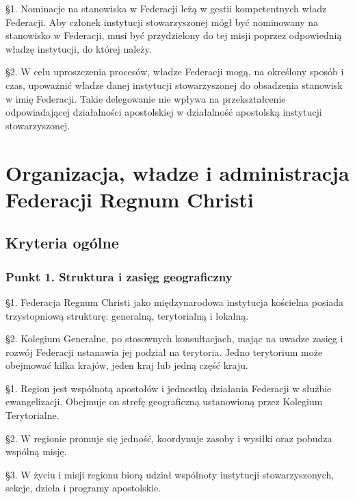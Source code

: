  
 \S{}1. Nominacje na stanowiska w Federacji leżą w gestii kompetentnych władz Federacji. Aby członek instytucji stowarzyszonej mógł być nominowany na stanowisko w Federacji, musi być przydzielony do tej misji poprzez odpowiednią władzę instytucji, do której należy.


\S{}2. W celu uproszczenia procesów, władze Federacji mogą, na określony sposób i czas, upoważnić władze danej instytucji stowarzyszonej do obsadzenia stanowisk w imię Federacji. Takie delegowanie nie wpływa na przekształcenie odpowiadającej działalności apostolskiej w działalność apostolską instytucji stowarzyszonej.
 


 \part{Organizacja, władze i administracja\\Federacji Regnum Christi}


 \chapter{Kryteria ogólne}


\section{Punkt 1. Struktura i zasięg geograficzny}


 
 \S{}1. Federacja Regnum Christi jako międzynarodowa instytucja kościelna posiada trzystopniową strukturę: generalną, terytorialną i lokalną.


\S{}2. Kolegium Generalne, po stosownych konsultacjach, mając na uwadze zasięg i rozwój Federacji ustanawia jej podział na terytoria. Jedno terytorium może obejmować kilka krajów, jeden kraj lub jedną część kraju.
 
 
 \S{}1. Region jest wspólnotą apostołów i jednostką działania Federacji w służbie ewangelizacji. Obejmuje on strefę geograficzną ustanowioną przez Kolegium Terytorialne.


\S{}2. W regionie promuje się  jedność, koordynuje zasoby i wysiłki oraz pobudza wspólną misję.


\S{}3. W życiu i misji regionu biorą udział wspólnoty instytucji stowarzyszonych, sekcje, dzieła i programy apostolskie. 


